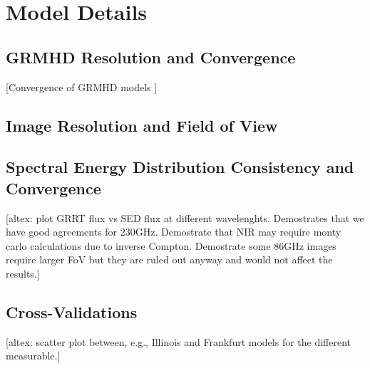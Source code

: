 \section{Model Details}\label{app:numerical}

\subsection{GRMHD Resolution and Convergence}\label{app:resolution_study}

[Convergence of GRMHD models ]

\subsection{Image Resolution and Field of View}

\subsection{Spectral Energy Distribution Consistency and Convergence}

\begin{figure*}
    \centering
    [altex: plot GRRT flux vs SED flux at different wavelenghts.  Demostrates that we have good agreements for 230GHz.  Demostrate that NIR may require monty carlo calculations due to inverse Compton.  Demostrate some 86GHz images require larger FoV but they are ruled out anyway and would not affect the results.]
    \caption{Comparing GRRT flux from monte carlo calculations.  The three columns are 86GHz, 230GHz, and NIR, respectively.  GRRT is only used to spot check x-ray and does not have a corresponding scatter plot.}
    \label{fig:sed_vv}
\end{figure*}

\subsection{Cross-Validations}

\begin{figure*}
    \centering
    [altex: scatter plot between, e.g., Illinois and Frankfurt models for the different measurable.]
    \caption{Comparing model predictions from different modeling pipelines.  ...}
    \label{fig:xv}
\end{figure*}